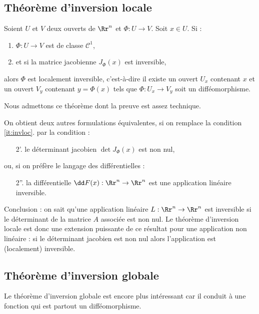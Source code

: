 \documentclass[11pt, class=report,crop=false]{standalone}
\begin{document}
\subsection{Théorème d'inversion locale}

\begin{theoreme}
Soient $U$ et $V$ deux ouverts de $\Rr^n$ et $\Phi:U\to V$.
Soit $x \in U$.
Si :
\begin{enumerate}
    \item $\Phi:U\to V$ est de classe $\mathcal{C}^1$,
    \item \label{it:invloc} et si la matrice jacobienne $J_\Phi(x)$ est inversible,
\end{enumerate}
alors $\Phi$ est localement inversible, c'est-à-dire il existe un ouvert $U_x$ contenant $x$ et un ouvert $V_y$ contenant $y=\Phi(x)$ tels que $\Phi : U_x \to V_y$ soit un difféomorphisme.
\end{theoreme}

Nous admettons ce théorème dont la preuve est assez technique.

\bigskip

On obtient deux autres formulations équivalentes, si on remplace la condition \ref{it:invloc}. par la condition :
\begin{itemize}
    \item[2'.] le déterminant jacobien $\det J_\Phi(x)$ est non nul,
\end{itemize}
ou, si on préfère le langage des différentielles :
\begin{itemize}
    \item[2''.] la différentielle $\dd F (x) : \Rr^n \to \Rr^n$ est une application linéaire inversible.
\end{itemize}

\bigskip

Conclusion : on sait qu'une application linéaire $L : \Rr^n \to \Rr^n$ est inversible si le déterminant de la matrice $A$ associée est non nul. Le théorème d'inversion locale est donc une extension puissante de ce résultat pour une application non linéaire : si le déterminant jacobien est non nul alors l'application est (localement) inversible.


\subsection{Théorème d'inversion globale}

Le théorème d'inversion globale est encore plus intéressant car il conduit à une fonction qui est partout un difféomorphisme.
\end{document}
